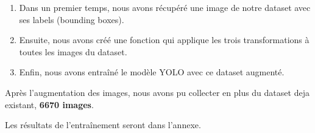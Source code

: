 \begin{enumerate}
	\item Dans un premier temps, nous avons récupéré une image de notre dataset avec ses labels (bounding boxes).
	\item Ensuite, nous avons créé une fonction qui applique les trois transformations à toutes les images du dataset.
	\item Enfin, nous avons entraîné le modèle YOLO avec ce dataset augmenté.
\end{enumerate}

Après l'augmentation des images, nous avons pu collecter en plus du dataset deja existant, \textbf{6670 images}.

Les résultats de l'entraînement seront dans l'annexe.

